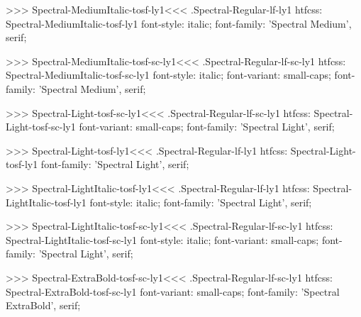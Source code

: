 >>>
\<Spectral-MediumItalic-tosf-ly1\><<<
.Spectral-Regular-lf-ly1
htfcss:  Spectral-MediumItalic-tosf-ly1  font-style: italic; font-family: 'Spectral Medium', serif;

>>>
\<Spectral-MediumItalic-tosf-sc-ly1\><<<
.Spectral-Regular-lf-sc-ly1
htfcss:  Spectral-MediumItalic-tosf-sc-ly1  font-style: italic; font-variant: small-caps; font-family: 'Spectral Medium', serif;

>>>
\<Spectral-Light-tosf-sc-ly1\><<<
.Spectral-Regular-lf-sc-ly1
htfcss:  Spectral-Light-tosf-sc-ly1  font-variant: small-caps; font-family: 'Spectral Light', serif;

>>>
\<Spectral-Light-tosf-ly1\><<<
.Spectral-Regular-lf-ly1
htfcss:  Spectral-Light-tosf-ly1  font-family: 'Spectral Light', serif;

>>>
\<Spectral-LightItalic-tosf-ly1\><<<
.Spectral-Regular-lf-ly1
htfcss:  Spectral-LightItalic-tosf-ly1  font-style: italic; font-family: 'Spectral Light', serif;

>>>
\<Spectral-LightItalic-tosf-sc-ly1\><<<
.Spectral-Regular-lf-sc-ly1
htfcss:  Spectral-LightItalic-tosf-sc-ly1  font-style: italic; font-variant: small-caps; font-family: 'Spectral Light', serif;

>>>
\<Spectral-ExtraBold-tosf-sc-ly1\><<<
.Spectral-Regular-lf-sc-ly1
htfcss:  Spectral-ExtraBold-tosf-sc-ly1  font-variant: small-caps; font-family: 'Spectral ExtraBold', serif;

